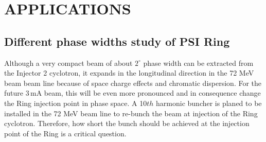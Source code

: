 \documentclass{JAC2003}
\begin{document}
\section{APPLICATIONS}

\subsection{Different phase widths study of PSI Ring}

Although a very compact beam of about $2^\circ$ phase width can be extracted from the Injector 2 cyclotron, it expands in the longitudinal direction in the 72 MeV beam 
beam line because of space charge effects and chromatic dispersion. For the future 3\,mA beam, this will be even more pronounced and in consequence change the
Ring injection point in phase space.
A 10$th$ harmonic buncher is planed to be installed in the 72 MeV beam line to re-bunch the beam at injection of the Ring cyclotron.
Therefore, how short the bunch should be achieved at the injection point of the Ring is a critical question. 
\end{document}
